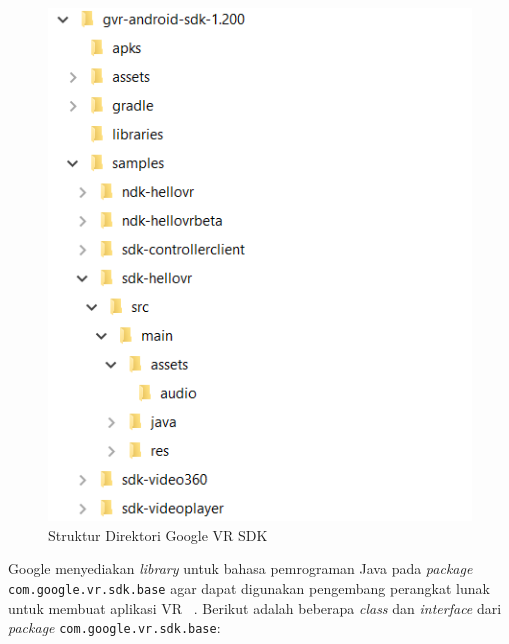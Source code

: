 \begin{figure}[h]
	\centering
		\includegraphics[scale=1.0]{Gambar/gvr_dir.png}
	\caption{Struktur Direktori Google VR SDK}
	\label{fig:gvr-dir}
\end{figure}

Google menyediakan \textit{library} untuk bahasa pemrograman Java pada \textit{package} \texttt{com.google.vr.sdk.base} agar dapat digunakan pengembang perangkat lunak untuk membuat aplikasi VR ~\cite{google-vr-sdk}. Berikut adalah beberapa \textit{class} dan \textit{interface} dari \textit{package} \texttt{com.google.vr.sdk.base}:

